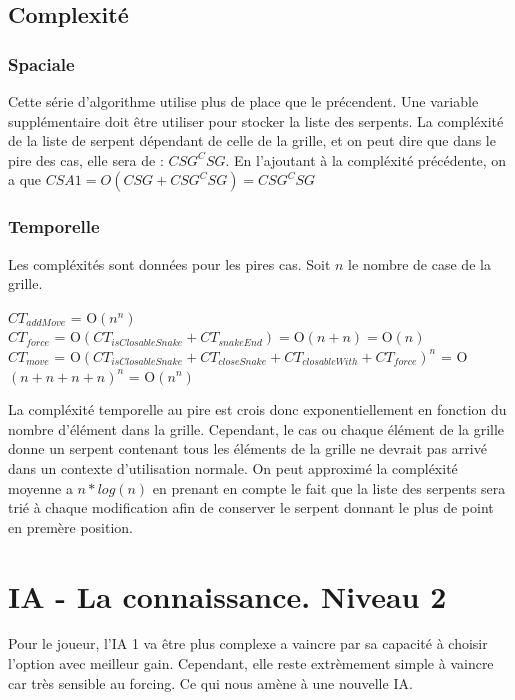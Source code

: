 \documentclass[a4paper,12pt]{report}
\begin{document}
\subsection{Complexit\'e}

\subsubsection{Spaciale}

Cette s\'erie d'algorithme utilise plus de place que le pr\'ecendent. Une variable suppl\'ementaire doit \^etre utiliser pour stocker la liste des serpents. La compl\'exit\'e de la liste de serpent d\'ependant de celle de la grille, et on peut dire que dans le pire des cas, elle sera de : $CSG^CSG$. En l'ajoutant \`a la compl\'exit\'e pr\'ec\'edente, on a que $CSA1=O(CSG+CSG^CSG)=CSG^CSG$

\subsubsection{Temporelle}

Les compl\'exit\'es sont donn\'ees pour les pires cas. Soit $n$ le nombre de case de la grille.

$CT_{addMove}$ = O$(n^n)$ \\
$CT_{force}$ = O$(CT_{isClosableSnake}+CT_{snakeEnd}) = $O$(n+n) = $O$(n)$ \\
$CT_{move}$ = O$(CT_{isClosableSnake}+CT_{closeSnake}+CT_{closableWith}+CT_{force})^n$ = O$(n+n+n+n)^n$ = O$(n^n)$


La compl\'exit\'e temporelle au pire est crois donc exponentiellement en fonction du nombre d'\'el\'ement dans la grille. Cependant, le cas ou chaque \'el\'ement de la grille donne un serpent contenant tous les \'el\'ements de la grille ne devrait pas arriv\'e dans un contexte d'utilisation normale. On peut approxim\'e la compl\'exit\'e moyenne a $n*log(n)$ en prenant en compte le fait que la liste des serpents sera tri\'e \`a chaque modification afin de conserver le serpent donnant le plus de point en prem\`ere position.
\section{IA - La connaissance. Niveau 2}

Pour le joueur, l'IA 1 va \^etre plus complexe a vaincre par sa capacit\'e \`a choisir l'option avec meilleur gain. Cependant, elle reste extr\`emement simple \`a vaincre car tr\`es sensible au forcing. Ce qui nous am\`ene \`a une nouvelle IA. 
\end{document}

